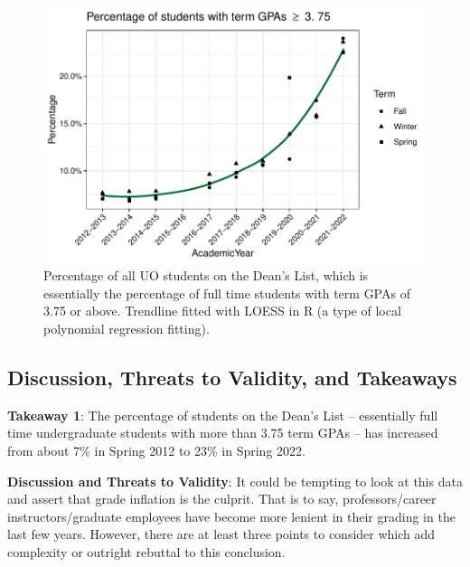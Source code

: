 \documentclass[10pt]{article}
\begin{document}
\begin{figure}[H]
	\centering
	\includegraphics[width=0.75\linewidth]{../visualizations/grade-inflation}
	\caption[Grade Inflation]{Percentage of all UO students on the Dean's List, which is essentially the percentage of full time students with term GPAs of 3.75 or above. Trendline fitted with LOESS in R (a type of local polynomial regression fitting).}
	\label{fig:grade-inflation}
\end{figure}


\subsection{Discussion, Threats to Validity, and Takeaways}

\textbf{Takeaway 1}: The percentage of students on the Dean's List -- essentially full time undergraduate students with more than 3.75 term GPAs -- has increased from about 7\% in Spring 2012 to 23\% in Spring 2022.

\textbf{Discussion and Threats to Validity}: It could be tempting to look at this data and assert that grade inflation is the culprit. That is to say, professors/career instructors/graduate employees have become more lenient in their grading in the last few years. However, there are at least three points to consider which add complexity or outright rebuttal to this conclusion.
\end{document}

